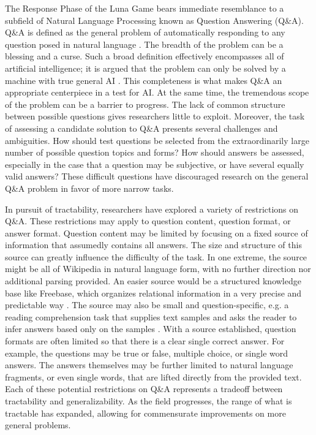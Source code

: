 The Response Phase of the Luna Game bears immediate resemblance to a subfield of Natural Language Processing known as Question Answering (Q\&A). Q\&A is defined as the general problem of automatically responding to any question posed in natural language \cite{andrenucci2005automated, hirschman2001natural}. The breadth of the problem can be a blessing and a curse. Such a broad definition effectively encompasses all of artificial intelligence; it is argued that the problem can only be solved by a machine with true general AI \cite{yampolskiy2013turing}. This completeness is what makes Q\&A an appropriate centerpiece in a test for AI. At the same time, the tremendous scope of the problem can be a barrier to progress. The lack of common structure between possible questions gives researchers little to exploit. Moreover, the task of assessing a candidate solution to Q\&A presents several challenges and ambiguities. How should test questions be selected from the extraordinarily large number of possible question topics and forms? How should answers be assessed, especially in the case that a question may be subjective, or have several equally valid answers? These difficult questions have discouraged research on the general Q\&A problem in favor of more narrow tasks.

In pursuit of tractability, researchers have explored a variety of restrictions on Q\&A. These restrictions may apply to question content, question format, or answer format. Question content may be limited by focusing on a fixed source of information that assumedly contains all answers. The size and structure of this source can greatly influence the difficulty of the task. In one extreme, the source might be all of Wikipedia in natural language form, with no further direction nor additional parsing provided. An easier source would be a structured knowledge base like Freebase, which organizes relational information in a very precise and predictable way \cite{bollacker2008freebase}. The source may also be small and question-specific, e.g. a reading comprehension task that supplies text samples and asks the reader to infer answers based only on the samples \cite{richardson2013mctest}. With a source established, question formats are often limited so that there is a clear single correct answer. For example, the questions may be true or false, multiple choice, or single word answers. The answers themselves may be further limited to natural language fragments, or even single words, that are lifted directly from the provided text. Each of these potential restrictions on Q\&A represents a tradeoff between tractability and generalizability. As the field progresses, the range of what is tractable has expanded, allowing for commensurate improvements on more general problems.

